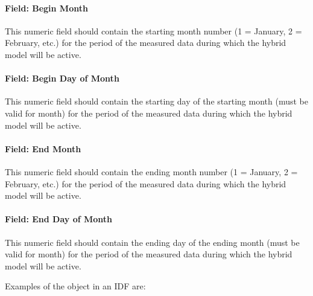 \paragraph{Field: Begin Month}\label{field-begin-month-hm}
This numeric field should contain the starting month number (1 = January, 2 = February, etc.) for the period of the measured data during which the hybrid model will be active.

\paragraph{Field: Begin Day of Month}\label{field-begin-day-of-month-hm}
This numeric field should contain the starting day of the starting month (must be valid for month) for the period of the measured data during which the hybrid model will be active.

\paragraph{Field: End Month}\label{field-end-month-hm}
This numeric field should contain the ending month number (1 = January, 2 = February, etc.) for the period of the measured data during which the hybrid model will be active.

\paragraph{Field: End Day of Month}\label{field-end-day-of-month-hm}
This numeric field should contain the ending day of the ending month (must be valid for month) for the period of the measured data during which the hybrid model will be active.

Examples of the object in an IDF are:

